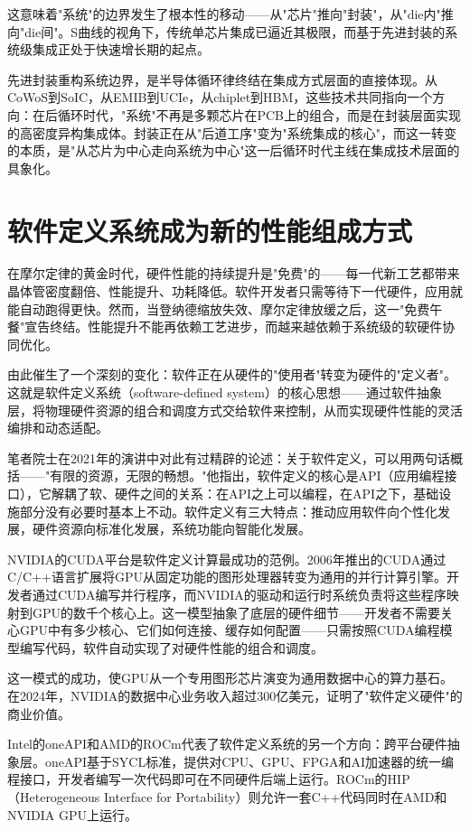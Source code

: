 \documentclass[11pt,a4paper]{article}
\begin{document}
这意味着"系统"的边界发生了根本性的移动——从"芯片"推向"封装"，从"die内"推向"die间"。S曲线的视角下，传统单芯片集成已逼近其极限，而基于先进封装的系统级集成正处于快速增长期的起点。

先进封装重构系统边界，是半导体循环律终结在集成方式层面的直接体现。从CoWoS到SoIC，从EMIB到UCIe，从chiplet到HBM，这些技术共同指向一个方向：在后循环时代，"系统"不再是多颗芯片在PCB上的组合，而是在封装层面实现的高密度异构集成体。封装正在从"后道工序"变为"系统集成的核心"，而这一转变的本质，是"从芯片为中心走向系统为中心"这一后循环时代主线在集成技术层面的具象化。

\section{软件定义系统成为新的性能组成方式}

在摩尔定律的黄金时代，硬件性能的持续提升是"免费"的——每一代新工艺都带来晶体管密度翻倍、性能提升、功耗降低。软件开发者只需等待下一代硬件，应用就能自动跑得更快。然而，当登纳德缩放失效、摩尔定律放缓之后，这一"免费午餐"宣告终结。性能提升不能再依赖工艺进步，而越来越依赖于系统级的软硬件协同优化。

由此催生了一个深刻的变化：软件正在从硬件的"使用者"转变为硬件的"定义者"。这就是软件定义系统（software-defined system）的核心思想——通过软件抽象层，将物理硬件资源的组合和调度方式交给软件来控制，从而实现硬件性能的灵活编排和动态适配。

笔者院士在2021年的演讲中对此有过精辟的论述：关于软件定义，可以用两句话概括——"有限的资源，无限的畅想。"他指出，软件定义的核心是API（应用编程接口），它解耦了软、硬件之间的关系：在API之上可以编程，在API之下，基础设施部分没有必要时基本上不动。软件定义有三大特点：推动应用软件向个性化发展，硬件资源向标准化发展，系统功能向智能化发展。

NVIDIA的CUDA平台是软件定义计算最成功的范例。2006年推出的CUDA通过C/C++语言扩展将GPU从固定功能的图形处理器转变为通用的并行计算引擎。开发者通过CUDA编写并行程序，而NVIDIA的驱动和运行时系统负责将这些程序映射到GPU的数千个核心上。这一模型抽象了底层的硬件细节——开发者不需要关心GPU中有多少核心、它们如何连接、缓存如何配置——只需按照CUDA编程模型编写代码，软件自动实现了对硬件性能的组合和调度。

这一模式的成功，使GPU从一个专用图形芯片演变为通用数据中心的算力基石。在2024年，NVIDIA的数据中心业务收入超过300亿美元，证明了"软件定义硬件"的商业价值。

Intel的oneAPI和AMD的ROCm代表了软件定义系统的另一个方向：跨平台硬件抽象层。oneAPI基于SYCL标准，提供对CPU、GPU、FPGA和AI加速器的统一编程接口，开发者编写一次代码即可在不同硬件后端上运行。ROCm的HIP（Heterogeneous Interface for Portability）则允许一套C++代码同时在AMD和NVIDIA GPU上运行。
\end{document}
